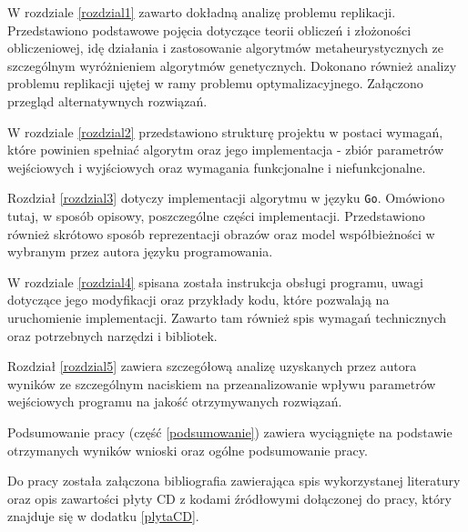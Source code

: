 W rozdziale \ref{rozdzial1} zawarto dokładną analizę problemu replikacji. Przedstawiono podstawowe pojęcia dotyczące teorii obliczeń i złożoności obliczeniowej, idę działania i zastosowanie algorytmów metaheurystycznych ze szczególnym wyróżnieniem algorytmów genetycznych. Dokonano również analizy problemu replikacji ujętej w ramy problemu optymalizacyjnego. Załączono przegląd alternatywnych rozwiązań.

W rozdziale \ref{rozdzial2} przedstawiono strukturę projektu w postaci wymagań, które powinien spełniać algorytm oraz jego implementacja - zbiór parametrów wejściowych i wyjściowych oraz wymagania funkcjonalne i niefunkcjonalne.

Rozdział \ref{rozdzial3} dotyczy implementacji algorytmu w języku \texttt{Go}. Omówiono tutaj, w sposób opisowy, poszczególne części implementacji. Przedstawiono również skrótowo sposób reprezentacji obrazów oraz model współbieżności w wybranym przez autora języku programowania.

W rozdziale \ref{rozdzial4} spisana została instrukcja obsługi programu, uwagi dotyczące jego modyfikacji oraz przykłady kodu, które pozwalają na uruchomienie implementacji. Zawarto tam również spis wymagań technicznych oraz potrzebnych narzędzi i bibliotek.

Rozdział \ref{rozdzial5} zawiera szczegółową analizę uzyskanych przez autora wyników ze szczególnym naciskiem na przeanalizowanie wpływu parametrów wejściowych programu na jakość otrzymywanych rozwiązań.

Podsumowanie pracy (część \ref{podsumowanie}) zawiera wyciągnięte na podstawie otrzymanych wyników wnioski oraz ogólne podsumowanie pracy.

Do pracy została załączona bibliografia zawierająca spis wykorzystanej literatury oraz opis zawartości płyty CD z kodami źródłowymi dołączonej do pracy, który znajduje się w dodatku \ref{plytaCD}. 


